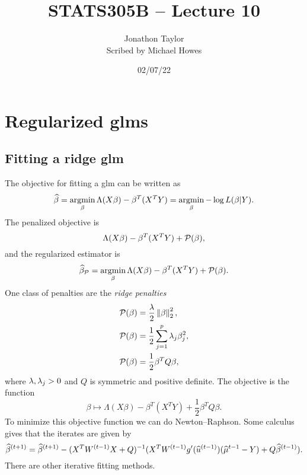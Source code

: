 




\title{STATS305B -- Lecture 10}
\author{Jonathon Taylor\\ Scribed by Michael Howes}
\date{02/07/22}

\pagestyle{fancy}
\fancyhf{}


\maketitle
\tableofcontents
\section{Regularized glms}
\subsection{Fitting a ridge glm}
The objective for fitting a glm can be written as
\[\widehat{\beta}=\operatorname*{argmin}_\beta \Lambda(X\beta)-\beta^T(X^TY) = \operatorname*{argmin}_\beta - \log L(\beta|Y). \]
The penalized objective is 
\[\Lambda(X\beta)-\beta^T(X^TY)+{\mathcal{P}}(\beta), \]
and the regularized estimator is
\[\widehat{\beta}_{\mathcal{P}} = \operatorname*{argmin}_\beta \Lambda(X\beta)-\beta^T(X^TY)+{\mathcal{P}}(\beta). \]
One class of penalties are the \emph{ridge penalties}
\begin{align*}
    {\mathcal{P}}(\beta)&=\frac{\lambda}{2}\left\|\beta\right\|_2^2,\\
    {\mathcal{P}}(\beta)&= \frac{1}{2}\sum_{j=1}^p \lambda_j \beta_j^2,\\
    {\mathcal{P}}(\beta)&= \frac{1}{2}\beta^TQ\beta,
\end{align*}
where $\lambda,\lambda_j > 0$ and $Q$ is symmetric and positive definite. The objective is the function
\[\beta \mapsto \Lambda(X\beta)-\beta^T(X^TY)+\frac{1}{2}\beta^TQ\beta. \]
To minimize this objective function we can do Newton--Raphson. Some calculus gives that the iterates are given by 
\[\widehat{\beta}^{(t+1)}=\widehat{\beta}^{(t+1)}-(X^TW^{(t-1)}X+Q)^{-1}(X^TW^{(t-1)}g'(\widehat{u}^{(t-1)})(\widehat{\mu}^{t-1}-Y)+Q\widehat{\beta}^{(t-1)}). \]
There are other iterative fitting methods.
